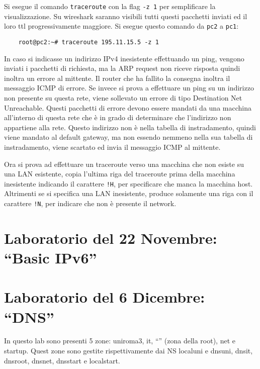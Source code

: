 \documentclass{article}
\numberwithin{equation}{subsection}
\begin{document}

Si esegue il comando \verb|traceroute| con la flag \verb|-z 1| per semplificare la visualizzazione. Su wireshark saranno visibili tutti questi pacchetti inviati ed 
il loro ttl progressivamente maggiore. Si esegue questo comando da \verb|pc2| a \verb|pc1|:
\begin{verbatim}
    root@pc2:~# traceroute 195.11.15.5 -z 1
\end{verbatim}

In caso si indicasse un indirizzo IPv4 inesistente effettuando un ping, vengono inviati i pacchetti di richiesta, ma la ARP request non riceve 
risposta quindi inoltra un errore al mittente. Il router che ha fallito la consegna inoltra il messaggio ICMP di errore. Se invece si prova a effettuare un ping 
su un indirizzo non presente su questa rete, viene sollevato un errore di tipo Destination Net Unreachable. Questi pacchetti di errore devono essere mandati da una macchina 
all'interno di questa rete che è in grado di determinare che l'indirizzo non appartiene alla rete. Questo indirizzo non è nella tabella di instradamento, quindi 
viene mandato al default gateway, ma non essendo nemmeno nella sua tabella di instradamento, viene scartato ed invia il messaggio ICMP al mittente. 

Ora si prova ad effettuare un traceroute verso una macchina che non esiste su una LAN esistente, copia l'ultima riga del traceroute prima della macchina inesistente 
indicando il carattere \verb|!H|, per specificare che manca la macchina host. Altrimenti se si specifica una LAN inesistente, produce solamente una riga con il 
carattere \verb|!N|, per indicare che non è presente il network. 

\clearpage

\section{Laboratorio del 22 Novembre: ``Basic IPv6''}


\clearpage

\section{Laboratorio del 6 Dicembre: ``DNS''}


In questo lab sono presenti 5 zone: uniroma3, it, ``'' (zona della root), net e startup. Quest zone sono gestite rispettivamente dai NS 
localuni e dnsuni, dnsit, dnsroot, dnsnet, dnsstart e localstart. 
\end{document}

